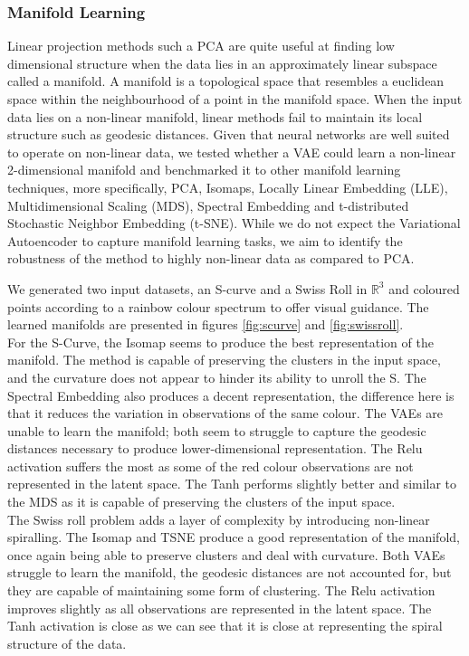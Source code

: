 \documentclass[12pt]{article}
\begin{document}
\subsubsection{Manifold Learning}
Linear projection methods such a PCA  are quite useful at finding low dimensional structure when the data lies in an approximately linear subspace called a manifold.  A manifold is a topological space that resembles a euclidean space within the neighbourhood of a point in the manifold space. When the input data lies on a non-linear manifold, linear methods fail to maintain its local structure such as geodesic distances.  Given that neural networks are well suited to operate on non-linear data, we tested whether a VAE could learn a non-linear 2-dimensional manifold and benchmarked it to other manifold learning techniques, more specifically, PCA, Isomaps, Locally Linear Embedding (LLE), Multidimensional Scaling (MDS), Spectral Embedding and t-distributed Stochastic Neighbor Embedding (t-SNE). While we do not expect the Variational Autoencoder to capture manifold learning tasks, we aim to identify the robustness of the method to highly non-linear data as compared to PCA.  


We generated two input datasets, an S-curve and a Swiss Roll in $\mathbb{R}^{3}$ and coloured points according to a rainbow colour spectrum to offer visual guidance. The learned manifolds are presented in figures \ref{fig:scurve} and \ref{fig:swissroll}. \\

For the S-Curve, the Isomap seems to produce the best representation of the manifold. The method is capable of preserving the clusters in the input space, and the curvature does not appear to hinder its ability to unroll the S. The Spectral Embedding also produces a decent representation, the difference here is that it reduces the variation in observations of the same colour.  The VAEs are unable to learn the manifold; both seem to struggle to capture the geodesic distances necessary to produce lower-dimensional representation. The  Relu activation suffers the most as some of the red colour observations are not represented in the latent space. The Tanh performs slightly better and similar to the MDS as it is capable of preserving the clusters of the input space.\\

The Swiss roll problem adds a layer of complexity by introducing non-linear spiralling. The Isomap and TSNE produce a good representation of the manifold, once again being able to preserve clusters and deal with curvature. Both VAEs struggle to learn the manifold, the geodesic distances are not accounted for, but they are capable of maintaining some form of clustering. The Relu activation improves slightly as all observations are represented in the latent space. The Tanh activation is close as we can see that it is close at representing the spiral structure of the data. \\
\end{document}
